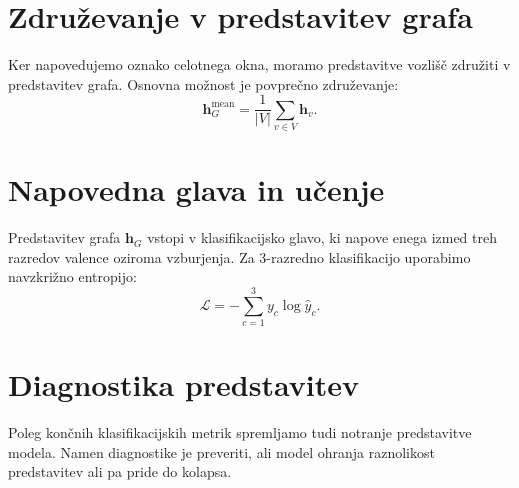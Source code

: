 \section{Združevanje v predstavitev grafa}
\label{subsec:pooling}

Ker napovedujemo oznako celotnega okna, moramo predstavitve vozlišč združiti v predstavitev grafa.
Osnovna možnost je povprečno združevanje:
\begin{equation}
    \mathbf{h}_G^{\text{mean}} =
    \frac{1}{|V|}
    \sum_{v \in V}
    \mathbf{h}_v.
\end{equation}


\section{Napovedna glava in učenje}
\label{subsec:head-training}

Predstavitev grafa $\mathbf{h}_G$ vstopi v klasifikacijsko glavo, ki napove enega izmed treh razredov valence oziroma vzburjenja.
Za 3-razredno klasifikacijo uporabimo navzkrižno entropijo:
\begin{equation}
    \mathcal{L}
    =
    - \sum_{c=1}^{3}
    y_c \log \hat{y}_c.
\end{equation}


\section{Diagnostika predstavitev}
\label{subsec:diagnostika}

Poleg končnih klasifikacijskih metrik spremljamo tudi notranje predstavitve modela.
Namen diagnostike je preveriti, ali model ohranja raznolikost predstavitev ali pa pride do kolapsa.


